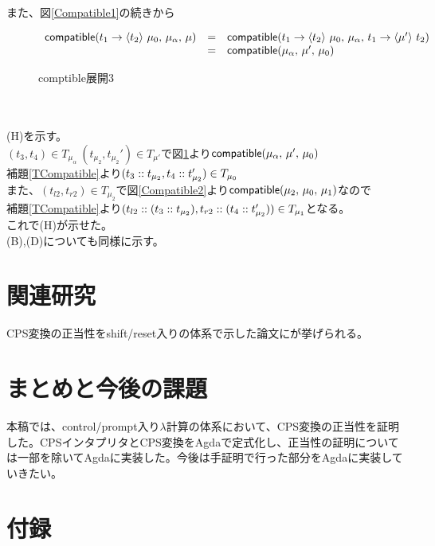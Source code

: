 \documentclass[japanese,draft]{jssst_ppl} %
\begin{document}
\\
また、図\ref{Compatible1}の続きから\\
\begin{figure}[h]
\[
\begin{array}{lcl}
  \Compatible{\Trail{t_1}{\mu_0}{t_2}}{\mu_{\alpha}}{\mu} &=& \Compatible{\Trail{t_1}{\mu_0}{t_2}}{\mu_{\alpha}}{\Trail{t_1}{t_2}{\mu'}}\\
  &=& \Compatible{\mu_{\alpha}}{\mu'}{\mu_0}
\end{array}
\]
\caption{\textsf{comptible}展開3}
\label{Compatible3}
\end{figure}\\
\\
(H)を示す。\\
$(t_3,t_4)\in T_{\mu_{\alpha}}\ (t_{\mu_2},t_{\mu_2}')\in T_{\mu'}$で図\ref{Compatible3}より$\Compatible{\mu_{\alpha}}{\mu'}{\mu_0}$\\
補題\ref{TCompatible}より$(\Cons{t_3}{t_{\mu_2}},\Cons{t_4}{t_{\mu_2}'})\in T_{\mu_0}$\\
また、$(t_{l2},t_{r2})\in T_{\mu_2}$で図\ref{Compatible2}より$\Compatible{\mu_2}{\mu_0}{\mu_1}$なので\\
補題\ref{TCompatible}より$(\Cons{t_{l2}}{\ConsP{t_3}{t_{\mu_2}}},\Cons{t_{r2}}{\ConsP{t_4}{t_{\mu_2}'}})\in T_{\mu_1}$となる。\\
これで(H)が示せた。\\
(B),(D)についても同様に示す。\\


\section{関連研究}
CPS変換の正当性をshift/reset入りの体系で示した論文に\cite{CHAM2020,CHAM2018}が挙げられる。



\section{まとめと今後の課題}
本稿では、control/prompt入り$\lambda$計算の体系において、CPS変換の正当性を証明した。CPSインタプリタとCPS変換をAgdaで定式化し、正当性の証明については一部を除いてAgdaに実装した。今後は手証明で行った部分をAgdaに実装していきたい。






\newpage
\section*{付録}
\end{document}
